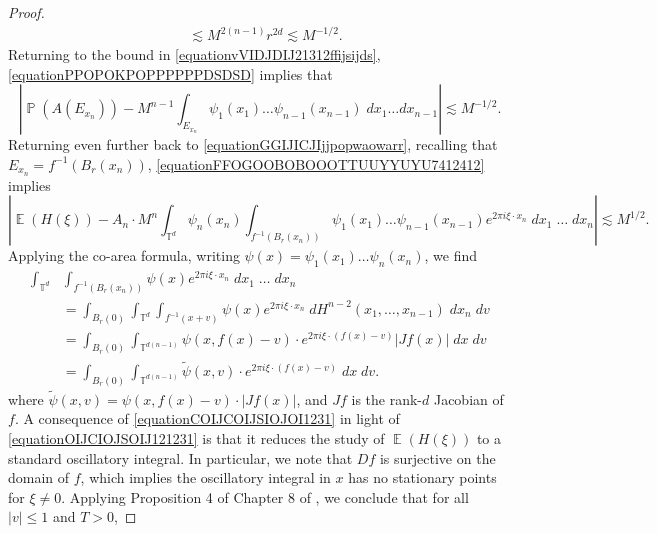 \documentclass[dvipsnames,letterpaper,12pt]{article}
\numberwithin{equation}{section}
\DeclareMathOperator{\TT}{\mathbb{T}}
\numberwithin{theorem}{section}
\DeclareMathOperator{\EE}{\mathbb{E}}
\DeclareMathOperator{\PP}{\mathbb{P}}
\begin{document}
\begin{proof}
\begin{equation}
\begin{split}
        &\lesssim M^{2(n-1)} r^{2d} \lesssim M^{-1/2}.
    \end{split}
    \end{equation}
    Returning to the bound in \eqref{equationvVIDJDIJ21312ffijsijds}, \eqref{equationPPOPOKPOPPPPPPDSDSD} implies that
    \begin{equation} \label{equationFFOGOOBOBOOOTTUUYYUYU7412412}
        \left| \PP(A(E_{x_n})) - M^{n-1} \int_{E_{x_n}} \psi_1(x_1) \dots \psi_{n-1}(x_{n-1})\; dx_1 \dots dx_{n-1} \right| \lesssim M^{-1/2}.
    \end{equation}
    Returning even further back to \eqref{equationGGIJICJIjjpopwaowarr}, recalling that $E_{x_n} = f^{-1}(B_r(x_n))$, \eqref{equationFFOGOOBOBOOOTTUUYYUYU7412412} implies
    \begin{equation} \label{equationOIJCIOJSOIJ121231}
        \left| \EE(H(\xi)) - A_n \cdot M^n \int_{\TT^d} \psi_n(x_n) \int_{f^{-1}(B_r(x_n))} \psi_1(x_1) \dots \psi_{n-1}(x_{n-1}) e^{2 \pi i \xi \cdot x_n}\; dx_1\; \dots\; dx_n \right| \lesssim M^{1/2}.
    \end{equation}
    Applying the co-area formula, writing $\psi(x) = \psi_1(x_1) \dots \psi_n(x_n)$, we find
    \begin{equation} \label{equationCOIJCOIJSIOJOI1231}
    \begin{split}
        \int_{\TT^d} & \int_{f^{-1}(B_r(x_n))} \psi(x) e^{2 \pi i \xi \cdot x_n}\; dx_1\; \dots\; dx_n\\
        &= \int_{B_r(0)} \int_{\TT^d} \int_{f^{-1}(x + v)} \psi(x) e^{2 \pi i \xi \cdot x_n}\; dH^{n-2}(x_1,\dots,x_{n-1})\; dx_n\; dv\\
        &= \int_{B_r(0)} \int_{\TT^{d(n-1)}} \psi(x,f(x) - v) \cdot e^{2 \pi i \xi \cdot (f(x) - v)} |Jf(x)|\; dx\; dv\\
        &= \int_{B_r(0)} \int_{\TT^{d(n-1)}} \tilde{\psi}(x,v) \cdot e^{2 \pi i \xi \cdot (f(x) - v)}\; dx\; dv.
    \end{split}
    \end{equation}
    where $\tilde{\psi}(x,v) = \psi(x,f(x) - v) \cdot |Jf(x)|$, and $Jf$ is the rank-$d$ Jacobian of $f$. A consequence of \eqref{equationCOIJCOIJSIOJOI1231} in light of \eqref{equationOIJCIOJSOIJ121231} is that it reduces the study of $\EE(H(\xi))$ to a standard oscillatory integral. In particular, we note that $Df$ is surjective on the domain of $f$, which implies the oscillatory integral in $x$ has no stationary points for $\xi \neq 0$. Applying Proposition 4 of Chapter 8 of \cite{Stein}, we conclude that for all $|v| \leq 1$ and $T > 0$,

\end{proof}
\end{document}
